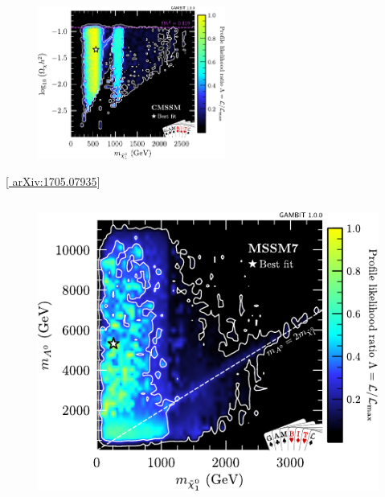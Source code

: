 \documentclass[10pt,aspectratio=169]{beamer}
\begin{document}
\begin{frame}
\begin{columns}[t]
\begin{column}{0.5\textwidth}
\begin{figure}
        \hspace{10pt}
        \includegraphics[width=0.55\textwidth]{gambit_gut_direct_detection}
      \end{figure}
      \vspace{-25pt}
      \begin{center}
            { \tiny [\href{http://arxiv.org/abs/1705.07935}{%
                  arXiv:1705.07935}] }
      \end{center}
      \begin{columns}[t]
        \begin{column}{0.5\textwidth}
          \vspace{-25pt}
          \begin{figure}
            \hspace{-50pt}
            \includegraphics[width=1.1\textwidth]{gambit_mssm7_mchi_mA}
          \end{figure}
          \vspace{-25pt}

\end{column}
\end{columns}
\end{column}
\end{columns}
\end{frame}
\end{document}
